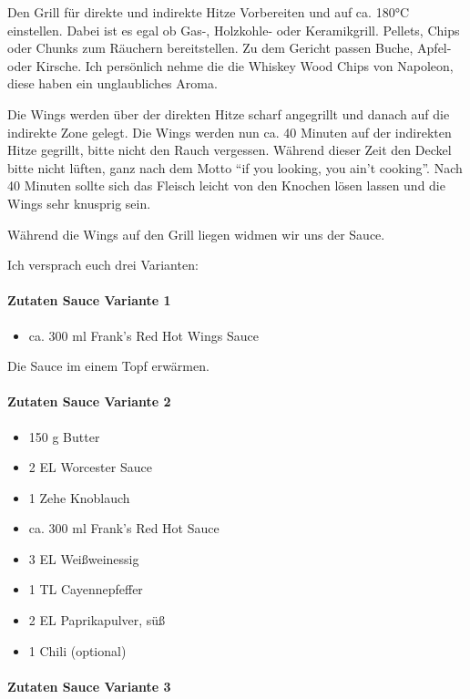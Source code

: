 Den Grill für direkte und indirekte Hitze Vorbereiten und auf ca. 180°C einstellen. Dabei ist es egal ob Gas-, Holzkohle- oder Keramikgrill. 
Pellets, Chips oder Chunks zum Räuchern bereitstellen. Zu dem Gericht passen Buche, Apfel- oder Kirsche. Ich persönlich nehme die die 
Whiskey Wood Chips von Napoleon, diese haben ein unglaubliches Aroma.


Die Wings werden über der direkten Hitze scharf angegrillt und danach auf die indirekte Zone gelegt. Die Wings werden nun  ca. 40 
Minuten auf der indirekten Hitze gegrillt, bitte nicht den Rauch vergessen. Während dieser Zeit den Deckel bitte nicht lüften, ganz nach 
dem Motto "`if you looking, you ain't cooking"'. Nach 40 Minuten sollte sich das Fleisch leicht von den Knochen lösen lassen und die 
Wings sehr knusprig sein.

Während die Wings auf den Grill liegen widmen wir uns der Sauce.

Ich versprach euch drei Varianten:

\paragraph{Zutaten Sauce Variante 1}

\begin{itemize}[noitemsep]
	\item ca. 300 ml Frank's Red Hot Wings Sauce
\end{itemize}

Die Sauce im einem Topf erwärmen.

\paragraph{Zutaten Sauce Variante 2}

\begin{itemize}[noitemsep]
	\item 150 g Butter
	\item 2 EL Worcester Sauce
	\item 1 Zehe Knoblauch
	\item ca. 300 ml Frank's Red Hot Sauce
	\item 3 EL Weißweinessig
	\item 1 TL Cayennepfeffer
	\item 2 EL Paprikapulver, süß
	\item 1 Chili (optional)
\end{itemize}

\paragraph{Zutaten Sauce Variante 3}

